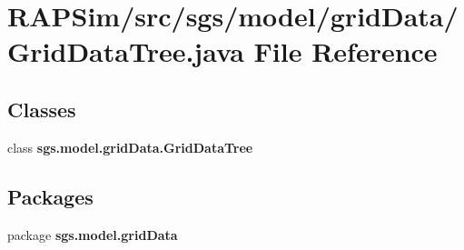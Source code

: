 \section{R\-A\-P\-Sim/src/sgs/model/grid\-Data/\-Grid\-Data\-Tree.java File Reference}
\label{_grid_data_tree_8java}
\subsection*{Classes}
\begin{DoxyCompactItemize}
\item 
class {\bf sgs.\-model.\-grid\-Data.\-Grid\-Data\-Tree}
\end{DoxyCompactItemize}
\subsection*{Packages}
\begin{DoxyCompactItemize}
\item 
package {\bf sgs.\-model.\-grid\-Data}
\end{DoxyCompactItemize}
